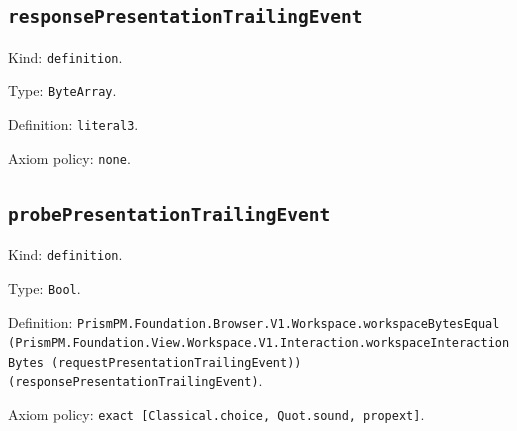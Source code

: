 \documentclass[11pt]{article}
\begin{document}
\subsection*{\texttt{responsePresentationTrailingEvent}}
\noindent Kind: \texttt{definition}.\par
\noindent Type: \texttt{ByteArray}.\par
\noindent Definition: \texttt{literal3}.\par
\noindent Axiom policy: \texttt{none}.\par
\subsection*{\texttt{probePresentationTrailingEvent}}
\noindent Kind: \texttt{definition}.\par
\noindent Type: \texttt{Bool}.\par
\noindent Definition: \texttt{PrismPM.Foundation.Browser.V1.Workspace.workspaceBytesEqual (PrismPM.Foundation.View.Workspace.V1.Interaction.workspaceInteractionBytes (requestPresentationTrailingEvent)) (responsePresentationTrailingEvent)}.\par
\noindent Axiom policy: \texttt{exact [Classical.choice, Quot.sound, propext]}.\par
\end{document}
